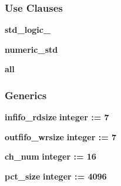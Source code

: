 \subsubsection*{Use Clauses}
 \begin{DoxyCompactItemize}
\item 
{\bf std\+\_\+logic\+\_}   
\item 
{\bf numeric\+\_\+std}   
\item 
{\bf  all }   
\end{DoxyCompactItemize}
\subsubsection*{Generics}
 \begin{DoxyCompactItemize}
\item 
{\bf infifo\+\_\+rdsize} {\bfseries {\bfseries \textcolor{comment}{integer}\textcolor{vhdlchar}{ }\textcolor{vhdlchar}{ }\textcolor{vhdlchar}{\+:}\textcolor{vhdlchar}{=}\textcolor{vhdlchar}{ }\textcolor{vhdlchar}{ } \textcolor{vhdldigit}{7} \textcolor{vhdlchar}{ }}}
\item 
{\bf outfifo\+\_\+wrsize} {\bfseries {\bfseries \textcolor{comment}{integer}\textcolor{vhdlchar}{ }\textcolor{vhdlchar}{ }\textcolor{vhdlchar}{\+:}\textcolor{vhdlchar}{=}\textcolor{vhdlchar}{ }\textcolor{vhdlchar}{ } \textcolor{vhdldigit}{7} \textcolor{vhdlchar}{ }}}
\item 
{\bf ch\+\_\+num} {\bfseries {\bfseries \textcolor{comment}{integer}\textcolor{vhdlchar}{ }\textcolor{vhdlchar}{ }\textcolor{vhdlchar}{\+:}\textcolor{vhdlchar}{=}\textcolor{vhdlchar}{ }\textcolor{vhdlchar}{ } \textcolor{vhdldigit}{16} \textcolor{vhdlchar}{ }}}
\item 
{\bf pct\+\_\+size} {\bfseries {\bfseries \textcolor{comment}{integer}\textcolor{vhdlchar}{ }\textcolor{vhdlchar}{ }\textcolor{vhdlchar}{\+:}\textcolor{vhdlchar}{=}\textcolor{vhdlchar}{ }\textcolor{vhdlchar}{ } \textcolor{vhdldigit}{4096} \textcolor{vhdlchar}{ }}}
\end{DoxyCompactItemize}
